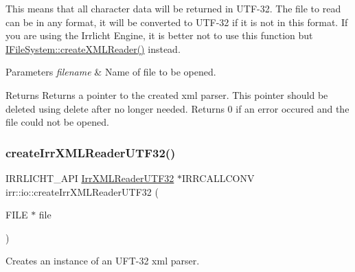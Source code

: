 This means that all character data will be returned in U\+T\+F-\/32. The file to read can be in any format, it will be converted to U\+T\+F-\/32 if it is not in this format. If you are using the Irrlicht Engine, it is better not to use this function but \hyperlink{classirr_1_1io_1_1IFileSystem_a167c9fa159d16ee5c56c074636b0865e}{I\+File\+System\+::create\+X\+M\+L\+Reader()} instead. 
\begin{DoxyParams}{Parameters}
{\em filename} & Name of file to be opened. \\
\hline
\end{DoxyParams}
\begin{DoxyReturn}{Returns}
Returns a pointer to the created xml parser. This pointer should be deleted using \textquotesingle{}delete\textquotesingle{} after no longer needed. Returns 0 if an error occured and the file could not be opened. 
\end{DoxyReturn}
\mbox{\label{namespaceirr_1_1io_a91353e14923adc422fdae4195eb67d05}} 
\subsubsection{\texorpdfstring{create\+Irr\+X\+M\+L\+Reader\+U\+T\+F32()}{createIrrXMLReaderUTF32()}\hspace{0.1cm}{\footnotesize\ttfamily [2/3]}}
{\footnotesize\ttfamily I\+R\+R\+L\+I\+C\+H\+T\+\_\+\+A\+PI \hyperlink{namespaceirr_1_1io_aa596f324a302585d965b1a28c562561b}{Irr\+X\+M\+L\+Reader\+U\+T\+F32} $\ast$I\+R\+R\+C\+A\+L\+L\+C\+O\+NV irr\+::io\+::create\+Irr\+X\+M\+L\+Reader\+U\+T\+F32 (\begin{DoxyParamCaption}\item[{F\+I\+LE $\ast$}]{file }\end{DoxyParamCaption})}



Creates an instance of an U\+F\+T-\/32 xml parser. 

